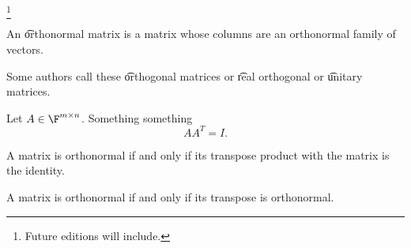 
\footnote{Future editions will include.}



An \t{orthonormal} matrix is a matrix whose columns are an orthonormal family of vectors.

Some authors call these \t{orthogonal} matrices or \t{real orthogonal} or \t{unitary} matrices.


Let $A \in \Mat{\F}{m}{n}$.
Something something
$$
  AA^T = I.
$$


\begin{prop}

  A matrix is orthonormal if and only if its transpose product with the matrix is the identity.

\end{prop}

\begin{prop}

A matrix is orthonormal if and only if its transpose is orthonormal.

\end{prop}

\blankpage
